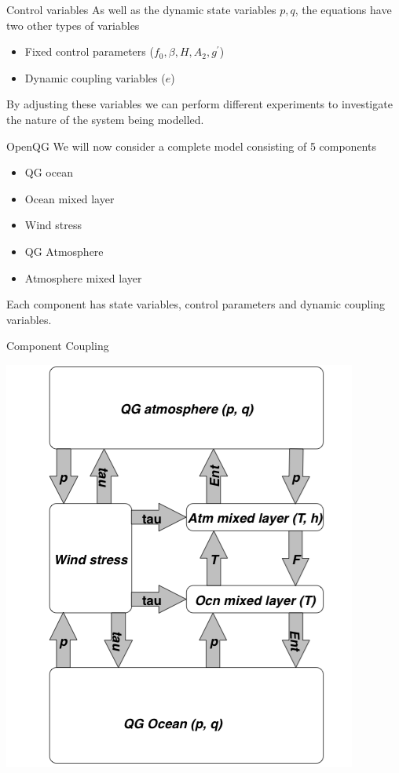 \documentclass[a4paper]{beamer}
\begin{document}
\begin{frame}{Control variables}
As well as the dynamic state variables $p, q$, the equations have two other types of variables
\begin{itemize}
\item Fixed control parameters ($f_0, \beta, H, A_2, g^\prime$)
\item Dynamic coupling variables ($e$)
\end{itemize}
By adjusting these variables we can perform different experiments to investigate the nature of the system being modelled.
\end{frame}

\begin{frame}{OpenQG}
We will now consider a complete model consisting of 5 components
\begin{itemize}
\item QG ocean
\item Ocean mixed layer
\item Wind stress
\item QG Atmosphere
\item Atmosphere mixed layer
\end{itemize}
Each component has state variables, control parameters and dynamic coupling variables.
\end{frame}

\begin{frame}{Component Coupling}
  \begin{center}
    \includegraphics[width=\textwidth,height=0.8\textheight,keepaspectratio]{OpenQG_Block_Diagram.png}
  \end{center}
\end{frame}
\end{document}
